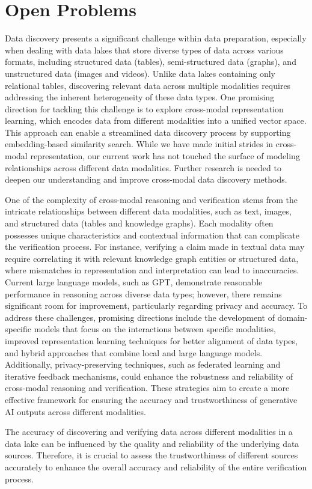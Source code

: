 \section{Open Problems}
\label{sec:open}

Data discovery presents a significant challenge within data preparation, especially when dealing with data lakes that store diverse types of data across various formats, including structured data (\eg tables), semi-structured data (\eg graphs), and unstructured data (\eg images and videos).
%
Unlike data lakes containing only relational tables, discovering relevant data across multiple modalities requires addressing the inherent heterogeneity of these data types.
%
One promising direction for tackling this challenge is to explore cross-modal representation learning, which encodes data from different modalities into a unified vector space. This approach can enable a streamlined data discovery process by supporting embedding-based similarity search.
%
While we have made initial strides in cross-modal representation, our current work has not touched the surface of modeling relationships across different data modalities. Further research is needed to deepen our understanding and improve cross-modal data discovery methods.

One of the complexity of cross-modal reasoning and verification stems from the intricate relationships between different data modalities, such as text, images, and structured data (\eg tables and knowledge graphs). Each modality often possesses unique characteristics and contextual information that can complicate the verification process. For instance, verifying a claim made in textual data may require correlating it with relevant knowledge graph entities or structured data, where mismatches in representation and interpretation can lead to inaccuracies.
Current large language models, such as GPT, demonstrate reasonable performance in reasoning across diverse data types; however, there remains significant room for improvement, particularly regarding privacy and accuracy. To address these challenges, promising directions include the development of domain-specific models that focus on the interactions between specific modalities, improved representation learning techniques for better alignment of data types, and hybrid approaches that combine local and large language models. Additionally, privacy-preserving techniques, such as federated learning and iterative feedback mechanisms, could enhance the robustness and reliability of cross-modal reasoning and verification. These strategies aim to create a more effective framework for ensuring the accuracy and trustworthiness of generative AI outputs across different modalities.

The accuracy of discovering and verifying data across different modalities in a data lake can be influenced by the quality and reliability of the underlying data sources. 
Therefore, it is crucial to assess the trustworthiness of different sources accurately to enhance the overall accuracy and reliability of the entire verification process.